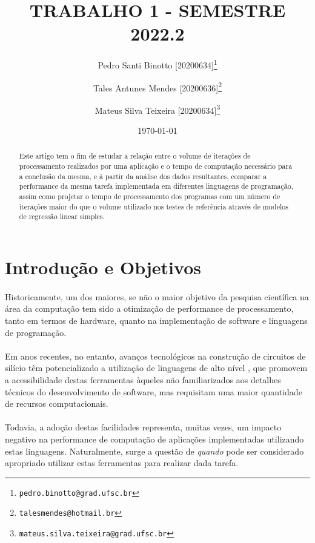 \documentclass[11pt]{article}
\title{TRABALHO 1 - SEMESTRE 2022.2}
\author[1]{Pedro Santi Binotto [20200634]\thanks{\texttt{pedro.binotto@grad.ufsc.br}}}
\author[1]{Tales Antunes Mendes [20200636]\thanks{\texttt{talesmendes@hotmail.br}}}
\author[1]{Mateus Silva Teixeira [20200634]\thanks{\texttt{mateus.silva.teixeira@grad.ufsc.br}}}
\date{\today}
\affil[1]{Departamento de Informática e Estatística, Universidade Federal de Santa Catarina}
\begin{document}
\maketitle

\begin{abstract}
Este artigo tem o fim de estudar a relação entre o volume de iterações de
processamento realizados por uma aplicação e o tempo de computação necessário
para a conclusão da mesma, e à partir da análise dos dados resultantes,
comparar a performance da mesma tarefa implementada em diferentes linguagens de
programação, assim como projetar o tempo de processamento dos programas com um
número de iterações maior do que o volume utilizado nos testes de referência
através de modelos de regressão linear simples.
\end{abstract}

\newpage
\section{Introdução e Objetivos}
\paragraph{}
Historicamente, um dos maiores, se não o maior objetivo da pesquisa científica
na área da computação tem sido a otimização de performance de processamento,
tanto em termos de hardware\cite{schaller1997moore}, quanto na implementação de
software e linguagens de programação.

\paragraph{}
Em anos recentes, no entanto, avanços tecnológicos na construção de circuitos
de silício têm potencializado a utilização de linguagens de alto nível
\cite{srinath2017python}, que promovem a acessibilidade destas ferramentas
àqueles não familiarizados aos detalhes técnicos do desenvolvimento de software,
mas requisitam uma maior quantidade de recursos computacionais.

\paragraph{}
Todavia, a adoção destas facilidades representa, muitas vezes, um impacto
negativo na performance de computação de aplicações implementadas utilizando
estas linguagens\cite{prechelt2000empirical}. Naturalmente, surge a questão de
\textit{quando} pode ser considerado apropriado utilizar estas ferramentas para
realizar dada tarefa.
\end{document}
